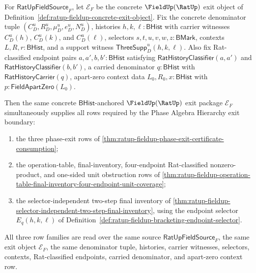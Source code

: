 \begin{theorem}
\label{thm:ratup-fieldup-full-algebra-hierarchy-exit-package}
For $\mathsf{RatUpFieldSource}_F$, let $\mathcal E_F$ be the concrete
$\FieldUp(\RatUp)$ exit object of
Definition~\ref{def:ratup-fieldup-concrete-exit-object}. Fix the concrete
denominator tuple $(C_D^u,R_D^u,\mu_D^u,e_D^u,N_D^u)$, histories
$h,k,\ell:\mathsf{BHist}$ with carrier witnesses $C_D^u(h)$, $C_D^u(k)$, and
$C_D^u(\ell)$, selectors $s,t,u,v,w,z:\mathsf{BMark}$, contexts
$L,R,r:\mathsf{BHist}$, and a support witness
$\mathsf{ThreeSupp}_D^u(h,k,\ell)$. Also fix Rat-classified endpoint pairs
$a,a',b,b':\mathsf{BHist}$ satisfying
$\mathsf{RatHistoryClassifier}(a,a')$ and
$\mathsf{RatHistoryClassifier}(b,b')$, a carried denominator
$q:\mathsf{BHist}$ with $\mathsf{RatHistoryCarrier}(q)$, apart-zero context
data $L_0,R_0,x:\mathsf{BHist}$ with
$p:\mathsf{FieldApartZero}(L_0)$.

Then the same concrete $\mathsf{BHist}$-anchored $\FieldUp(\RatUp)$ exit
package $\mathcal E_F$ simultaneously supplies all rows required by the Phase
Algebra Hierarchy exit boundary:
\begin{enumerate}
  \item the three phase-exit rows of
  \autoref{thm:ratup-fieldup-phase-exit-certificate-consumption};
  \item the operation-table, final-inventory, four-endpoint Rat-classified
  nonzero-product, and one-sided unit obstruction rows of
  \autoref{thm:ratup-fieldup-operation-table-final-inventory-four-endpoint-unit-coverage};
  \item the selector-independent two-step final inventory of
  \autoref{thm:ratup-fieldup-selector-independent-two-step-final-inventory},
  using the endpoint selector $E_q(h,k,\ell)$ of
  Definition~\ref{def:ratup-fieldup-bracketing-endpoint-selector}.
\end{enumerate}
All three row families are read over the same source
$\mathsf{RatUpFieldSource}_F$, the same exit object $\mathcal E_F$, the same
denominator tuple, histories, carrier witnesses, selectors, contexts,
Rat-classified endpoints, carried denominator, and apart-zero context row.
\end{theorem}
